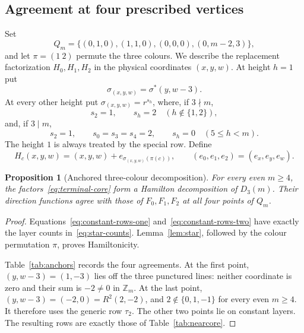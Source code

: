 \documentclass[11pt,reqno]{amsart}
\numberwithin{equation}{section}
\newtheorem{proposition}[theorem]{Proposition}
\theoremstyle{definition}
\theoremstyle{remark}
\newcommand{\Zm}{\mathbb Z_m}
\begin{document}
\subsection{Agreement at four prescribed vertices}
Set
\begin{equation}\label{eq:anchors}
 Q_m=\{(0,1,0),(1,1,0),(0,0,0),(0,m-2,3)\},
\end{equation}
and let $\pi=(1\ 2)$ permute the three colours. We describe the replacement
factorization $H_0,H_1,H_2$ in the physical coordinates $(x,y,w)$.
At height $h=1$ put
\[
 \sigma_{(x,y,w)}=\sigma^*(y,w-3).
\]
At every other height put $\sigma_{(x,y,w)}=r^{s_h}$, where, if $3\nmid m$,
\begin{equation}\label{eq:constant-rows-one}
 s_2=1,\qquad s_h=2\quad(h\notin\{1,2\}),
\end{equation}
and, if $3\mid m$,
\begin{equation}\label{eq:constant-rows-two}
 s_2=1,\qquad s_0=s_3=s_4=2,\qquad s_h=0\quad(5\le h<m).
\end{equation}
The height $1$ is always treated by the special row. Define
\begin{equation}\label{eq:terminal-core}
 H_c(x,y,w)=(x,y,w)+e_{\sigma_{(x,y,w)}(\pi(c))},
 \qquad(e_0,e_1,e_2)=(e_x,e_y,e_w).
\end{equation}

\begin{proposition}[Anchored three-colour decomposition]\label{prop:anchor}
For every even $m\ge4$, the factors~\eqref{eq:terminal-core} form a Hamilton
decomposition of $D_3(m)$. Their direction functions agree with those of
$F_0,F_1,F_2$ at all four points of $Q_m$.
\end{proposition}
\begin{proof}
Equations~\eqref{eq:constant-rows-one} and~\eqref{eq:constant-rows-two} have
exactly the layer counts in~\eqref{eq:star-counts}. Lemma~\ref{lem:star}, followed
by the colour permutation $\pi$, proves Hamiltonicity.

Table~\ref{tab:anchors} records the four agreements. At the first point,
$(y,w-3)=(1,-3)$ lies off the three punctured lines: neither coordinate is zero
and their sum is $-2\ne0$ in $\Zm$. At the last point,
$(y,w-3)=(-2,0)=R^2(2,-2)$, and $2\notin\{0,1,-1\}$ for every even $m\ge4$.
It therefore uses the generic row $\tau_2$. The other two points lie on
constant layers. The resulting rows are exactly those of
Table~\ref{tab:nearcore}.
\end{proof}
\end{document}
